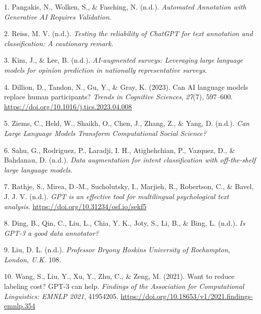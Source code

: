 \documentclass[
  10pt,
  twocolumn]{article}
\newlength{\cslhangindent}
\newlength{\cslentryspacingunit} %
\newenvironment{CSLReferences}[2] %
 {%
  \setlength{\parindent}{0pt}
  \ifodd #1
  \let\oldpar\par
  \def\par{\hangindent=\cslhangindent\oldpar}
  \fi
  \setlength{\parskip}{#2\cslentryspacingunit}
 }%
 {}
\begin{document}
\hypertarget{refs}{}
\begin{CSLReferences}{1}{0}
\leavevmode{}%
1. Pangakis, N., Wolken, S., \& Fasching, N. (n.d.). \emph{Automated
Annotation with Generative AI Requires Validation}.

\leavevmode{}%
2. Reiss, M. V. (n.d.). \emph{Testing the reliability of ChatGPT for
text annotation and classification: A cautionary remark}.

\leavevmode{}%
3. Kim, J., \& Lee, B. (n.d.). \emph{AI-augmented surveys: Leveraging
large language models for opinion prediction in nationally
representative surveys}.

\leavevmode{}%
4. Dillion, D., Tandon, N., Gu, Y., \& Gray, K. (2023). Can AI language
models replace human participants? \emph{Trends in Cognitive Sciences},
\emph{27}(7), 597--600. \url{https://doi.org/10.1016/j.tics.2023.04.008}

\leavevmode{}%
5. Ziems, C., Held, W., Shaikh, O., Chen, J., Zhang, Z., \& Yang, D.
(n.d.). \emph{Can Large Language Models Transform Computational Social
Science?}

\leavevmode{}%
6. Sahu, G., Rodriguez, P., Laradji, I. H., Atighehchian, P., Vazquez,
D., \& Bahdanau, D. (n.d.). \emph{Data augmentation for intent
classification with off-the-shelf large language models}.

\leavevmode{}%
7. Rathje, S., Mirea, D.-M., Sucholutsky, I., Marjieh, R., Robertson,
C., \& Bavel, J. J. V. (n.d.). \emph{GPT is an effective tool for
multilingual psychological text analysis}.
\url{https://doi.org/10.31234/osf.io/sekf5}

\leavevmode{}%
8. Ding, B., Qin, C., Liu, L., Chia, Y. K., Joty, S., Li, B., \& Bing,
L. (n.d.). \emph{Is GPT-3 a good data annotator?}

\leavevmode{}%
9. Liu, D. L. (n.d.). \emph{Professor Bryony Hoskins University of
Roehampton, London, U.K.} 108.

\leavevmode{}%
10. Wang, S., Liu, Y., Xu, Y., Zhu, C., \& Zeng, M. (2021). Want to
reduce labeling cost? GPT-3 can help. \emph{Findings of the Association
for Computational Linguistics: EMNLP 2021}, 41954205.
\url{https://doi.org/10.18653/v1/2021.findings-emnlp.354}


\end{CSLReferences}
\end{document}
